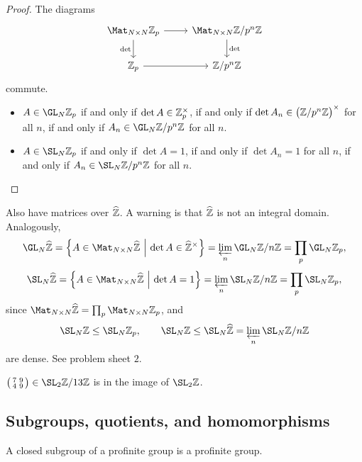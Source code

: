 \begin{proof}
The diagrams
$$
\begin{tikzcd}
\Mat_{N \times N} \ZZ_p \arrow{r} \arrow{d}[swap]{\det} & \Mat_{N \times N} \ZZ / p^n\ZZ \arrow{d}{\det} \\
\ZZ_p \arrow{r} & \ZZ / p^n\ZZ
\end{tikzcd}
$$
commute.
\begin{itemize}
\item $ A \in \GL_N \ZZ_p $ if and only if $ \det A \in \mathbb{Z}_p^\times $, if and only if $ \det A_n \in \br{\ZZ / p^n\ZZ}^\times $ for all $ n $, if and only if $ A_n \in \GL_N \ZZ / p^n\ZZ $ for all $ n $.
\item $ A \in \SL_N \ZZ_p $ if and only if $ \det A = 1 $, if and only if $ \det A_n = 1 $ for all $ n $, if and only if $ A_n \in \SL_N \ZZ / p^n\ZZ $ for all $ n $.
\end{itemize}
\end{proof}

Also have matrices over $ \widehat{\mathbb{Z}} $. A warning is that $ \widehat{\mathbb{Z}} $ is not an integral domain. Analogously,
$$ \GL_N \widehat{\ZZ} = \cbr{A \in \Mat_{N \times N} \widehat{\ZZ} \st \det A \in \widehat{\ZZ}^\times} = \varprojlim_n \GL_N \ZZ / n\ZZ = \prod_p \GL_N \ZZ_p, $$
$$ \SL_N \widehat{\ZZ} = \cbr{A \in \Mat_{N \times N} \widehat{\ZZ} \st \det A = 1} = \varprojlim_n \SL_N \ZZ / n\ZZ = \prod_p \SL_N \ZZ_p, $$
since $ \Mat_{N \times N} \widehat{\ZZ} = \prod_p \Mat_{N \times N} \ZZ_p $, and
$$ \SL_N \ZZ \le \SL_N \ZZ_p, \qquad \SL_N \ZZ \le \SL_N \widehat{\ZZ} = \varprojlim_n \SL_N \ZZ / n\ZZ $$
are dense. See problem sheet $ 2 $.

\begin{example}
$ \twobytwosmall{7}{9}{4}{9} \in \SL_2 \ZZ / 13\ZZ $ is in the image of $ \SL_2 \ZZ $.
\end{example}

\pagebreak

\subsection{Subgroups, quotients, and homomorphisms}

\begin{proposition}
A closed subgroup of a profinite group is a profinite group.
\end{proposition}

